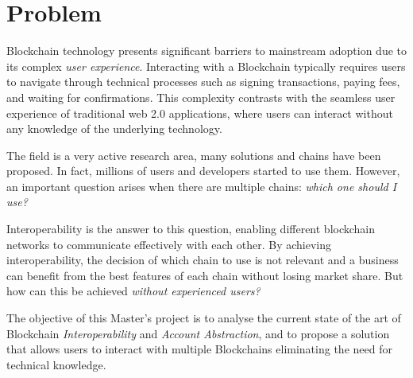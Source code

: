 \chapter{Problem}
\label{chap:problem}

Blockchain technology presents significant barriers to mainstream adoption due to its complex \textit{user experience}. Interacting with a Blockchain typically requires users to navigate through technical processes such as signing transactions, paying fees, and waiting for confirmations. This complexity contrasts with the seamless user experience of traditional web 2.0 applications, where users can interact without any knowledge of the underlying technology.

The field is a very active research area, many solutions and chains have been proposed. In fact, millions of users and developers started to use them. \cite{blockchain-statistics} However, an important question arises when there are multiple chains: \textit{which one should I use?}

Interoperability is the answer to this question, enabling different blockchain networks to communicate effectively with each other. By achieving interoperability, the decision of which chain to use is not relevant and a business can benefit from the best features of each chain without losing market share. But how can this be achieved \textit{without experienced users?}

The objective of this Master's project is to analyse the current state of the art of Blockchain \textit{Interoperability} and \textit{Account Abstraction}, and to propose a solution that allows users to interact with multiple Blockchains eliminating the need for technical knowledge.
